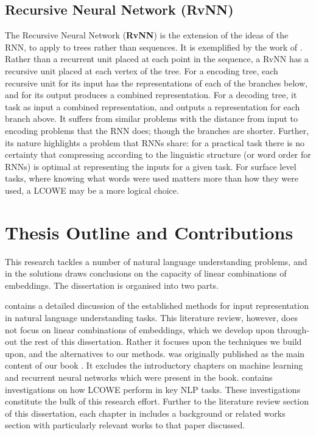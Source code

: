 \documentclass{book}
\begin{document}
\subsection {Recursive Neural Network (RvNN)}
The Recursive Neural Network (\textbf{RvNN}) is the extension of the ideas of the RNN,
to apply to trees rather than sequences.
It is exemplified by the work of \citet{socher2014recursive}.
Rather than a recurrent unit placed at each point in the sequence,
a RvNN has a recursive unit placed at each vertex of the tree.
For a encoding tree, each recursive unit for its input has the representations of each of the branches below,
and for its output produces a combined representation.
For a decoding tree, it task as input a combined representation, and outputs a representation for each branch above.
It suffers from similar problems with the distance from input  to encoding problems that the RNN does;
though the branches are shorter.
Further, its nature highlights a problem that RNNs share:
for a practical task there is no certainty  that compressing according to the linguistic structure (or word order for RNNs) is optimal at representing the inputs for a given task.
For surface level tasks, where knowing what words were used matters more than how they were used,
a LCOWE may be a more logical choice.

\section{Thesis Outline and Contributions}
This research tackles a number of natural language understanding problems, and in the solutions draws conclusions on the capacity of linear combinations of embeddings.
The dissertation is organised into two parts.

 contains a detailed discussion of the established methods for input representation in natural language understanding tasks.
This literature review, however, does not focus on linear combinations of embeddings, which we develop upon through-out the rest of this dissertation.
Rather it focuses upon the techniques we build upon, and the alternatives to our methods.
 was originally published as the main content of our book  \citep{NRoNL}.
It excludes the introductory chapters on machine learning and recurrent neural networks which were present in the book.
 contains investigations on how LCOWE perform in key NLP tasks.
These investigations constitute the bulk of this research effort.
Further to the literature review section of this dissertation, each chapter in  includes a background or related works section with particularly relevant works to that paper discussed.
\end{document}
